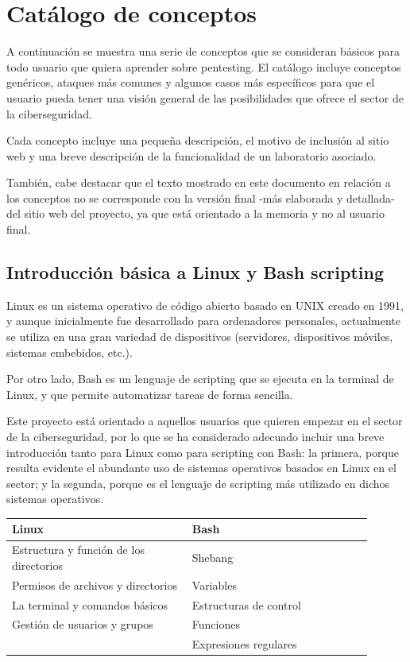            \newpage
        
        
\chapter{Catálogo de conceptos}
    \label{sec:catalogo}

    A continuación se muestra una serie de conceptos que se consideran básicos para todo usuario que quiera aprender sobre pentesting. El catálogo incluye conceptos genéricos, ataques más comunes y algunos casos más específicos para que el usuario pueda tener una visión general de las posibilidades que ofrece el sector de la ciberseguridad.

    Cada concepto incluye una pequeña descripción, el motivo de inclusión al sitio web y una breve descripción de la funcionalidad de un laboratorio asociado.

    También, cabe destacar que el texto mostrado en este documento en relación a los conceptos no se corresponde con la versión final -más elaborada y detallada- del sitio web del proyecto, ya que está orientado a la memoria y no al usuario final.


    \section{Introducción básica a Linux y Bash scripting}
        \label{sec:catalogo-linux-bash}

        Linux es un sistema operativo de código abierto basado en UNIX creado en 1991, y aunque inicialmente fue desarrollado para ordenadores personales, actualmente se utiliza en una gran variedad de dispositivos (servidores, dispositivos móviles, sistemas embebidos, etc.).

        Por otro lado, Bash es un lenguaje de scripting que se ejecuta en la terminal de Linux, y que permite automatizar tareas de forma sencilla.

        Este proyecto está orientado a aquellos usuarios que quieren empezar en el sector de la ciberseguridad, por lo que se ha considerado adecuado incluir una breve introducción tanto para Linux como para scripting con Bash: la primera, porque resulta evidente el abundante uso de sistemas operativos basados en Linux en el sector; y la segunda, porque es el lenguaje de scripting más utilizado en dichos sistemas operativos.

        \begin{tabular}{|m{0.45\linewidth}|m{0.45\linewidth}|}                
            \hline
            \textbf{Linux} & \textbf{Bash} \\
            \hline
            Estructura y función de los directorios & Shebang \\
            Permisos de archivos y directorios & Variables \\
            La terminal y comandos básicos & Estructuras de control \\
            Gestión de usuarios y grupos & Funciones \\
            & Expresiones regulares \\
            \hline
        \end{tabular}

